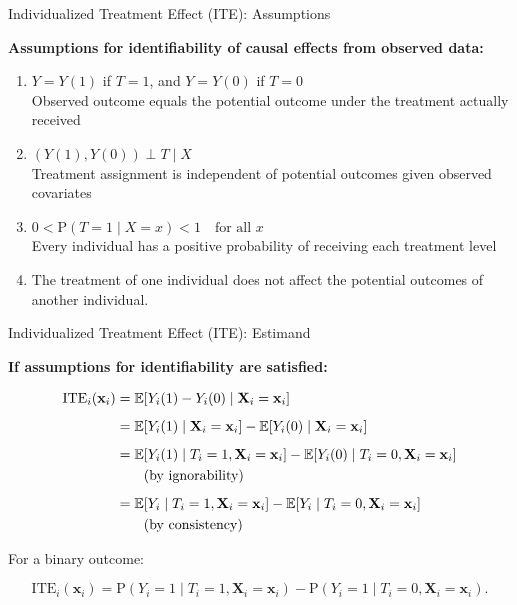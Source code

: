 \documentclass[onlytextwidth,english]{beamer}\usepackage[]{graphicx}\usepackage[]{xcolor}
\begin{document}
\begin{frame}{Individualized Treatment Effect (ITE): Assumptions}


\textbf{Assumptions for identifiability of causal effects from observed data:}

\begin{enumerate}
    \item {} $Y = Y(1)$ if $T = 1$, and $Y = Y(0)$ if $T = 0$ \\
    Observed outcome equals the potential outcome under the treatment actually received
    \item {} $(Y(1), Y(0)) \perp T \mid X$ \\
    Treatment assignment is independent of potential outcomes given observed covariates
    \item {} $0 < \text{P}(T = 1 \mid X = x) < 1 \quad \text{for all } x$ \\
    Every individual has a positive probability of receiving each treatment level
    \item {} The treatment of one individual does not affect the potential outcomes of another individual.
\end{enumerate}

\end{frame}



\begin{frame}{Individualized Treatment Effect (ITE): Estimand}

\textbf{If assumptions for identifiability are satisfied:}

\begin{align}
\text{ITE}_i(\mathbf{x}_i) &= \mathbb{E}[Y_i(1) - Y_i(0) \mid \mathbf{X}_i = \mathbf{x}_i] \notag \\[0.5em]
&= \mathbb{E}[Y_i(1) \mid \mathbf{X}_i = \mathbf{x}_i] - \mathbb{E}[Y_i(0) \mid \mathbf{X}_i = \mathbf{x}_i] \notag \\[0.5em]
&= \mathbb{E}[Y_i(1) \mid T_i = 1, \mathbf{X}_i = \mathbf{x}_i]
  - \mathbb{E}[Y_i(0) \mid T_i = 0, \mathbf{X}_i = \mathbf{x}_i] \\
&\quad \quad \text{(by ignorability)} \notag \\[0.5em] %
&= \mathbb{E}[Y_i \mid T_i = 1, \mathbf{X}_i = \mathbf{x}_i]
  - \mathbb{E}[Y_i \mid T_i = 0, \mathbf{X}_i = \mathbf{x}_i] \notag \\
&\quad \quad \text{(by consistency)} \notag %
\end{align}



For a binary outcome:

\vspace{-0.5cm}

\begin{equation}
\text{ITE}_i(\mathbf{x}_i) = \text{P}(Y_i = 1 \mid T_i = 1, \mathbf{X}_i = \mathbf{x}_i) - \text{P}(Y_i = 1 \mid T_i = 0, \mathbf{X}_i = \mathbf{x}_i).
\end{equation}

\end{frame}
\end{document}

